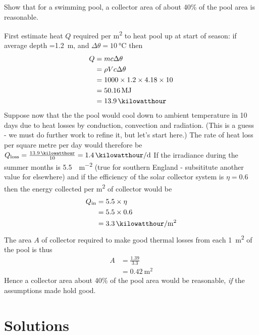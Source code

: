 \documentclass{article} %
\begin{document}
\begin{question}
Show that for a swimming pool, a collector area of about 40\% of the pool area is reasonable.
\end{question}
\begin{solution}
First estimate heat $Q$ required per \si{\metre\squared} to heat pool up at start of season: if average depth =\SI{1.2}{\metre}, and $\Delta\theta = \SI{10}{\celsius}$ then
\begin{align*}
Q&=mc\Delta\theta\\
&=\rho Vc\Delta\theta\\
&=1000\times 1.2\times4.18\times10\\
&=\SI{50.16}{\mega\joule}\\&=\SI{13.9}{\kilowatthour}
\end{align*}
Suppose now that the the pool would cool down to ambient temperature in 10 days due to heat losses by conduction, convection and radiation. (This is a guess - we must do further work to refine it, but let's start here.) The rate of heat loss per square metre per day would therefore be $Q_\text{loss}=\frac{\SI{13.9}{\kilowatthour}}{10}=\SI{1.4}{\kilowatthour\per\day}$ If the irradiance during the summer months is \SI{5.5}{\kilowatthour\per\metre\squared} (true for southern England - subsititute another value for elsewhere) and if the efficiency of the solar collector system is $\eta=0.6$ then the energy collected per \si{\metre\squared} of collector would be
\begin{align*}
Q_\text{in}&=5.5\times\eta\\
&=5.5\times 0.6\\
&=\SI{3.3}{\kilowatthour\per\metre\squared}
\end{align*}
The area $A$ of collector required to make good thermal losses from each \SI{1}{\metre\squared} of the pool is thus
\begin{align*}
A&=\frac{1.39}{3.3}\\
&=\SI{0.42}{\metre\squared}
\end{align*}
Hence a collector area about 40\% of the pool area would be reasonable, \emph{if} the assumptions made hold good.
\end{solution}

\section*{Solutions}
\printsolutions
\end{document}
